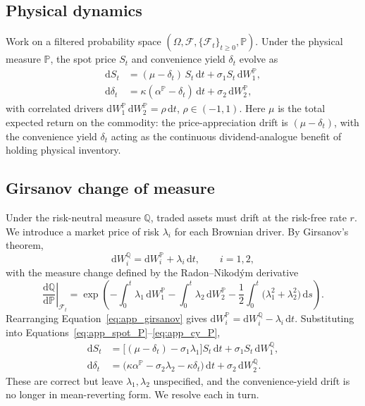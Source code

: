 \documentclass[11pt, a4paper]{article}
\newcommand{\convyield}{\delta}             %
\newcommand{\meanrev}{\kappa}               %
\newcommand{\longrun}{\alpha}               %
\begin{document}
\subsection{Physical dynamics}

Work on a filtered probability space $(\Omega, \mathcal{F}, \{\mathcal{F}_t\}_{t\geq 0}, \mathbb{P})$. Under the physical measure $\mathbb{P}$, the spot price $S_t$ and convenience yield $\convyield_t$ evolve as
\begin{align}
  \label{eq:app_spot_P}
  \mathrm{d}S_t &= (\mu - \convyield_t)\,S_t\,\mathrm{d}t + \sigma_1 S_t\,\mathrm{d}W_1^{\mathbb{P}}, \\
  \label{eq:app_cy_P}
  \mathrm{d}\convyield_t &= \meanrev(\longrun^{\mathbb{P}} - \convyield_t)\,\mathrm{d}t + \sigma_2\,\mathrm{d}W_2^{\mathbb{P}},
\end{align}
\noindent
with correlated drivers $\mathrm{d}W_1^{\mathbb{P}}\,\mathrm{d}W_2^{\mathbb{P}} = \rho\,\mathrm{d}t$, $\rho \in (-1, 1)$. Here $\mu$ is the total expected return on the commodity: the price-appreciation drift is $(\mu - \convyield_t)$, with the convenience yield $\convyield_t$ acting as the continuous dividend-analogue benefit of holding physical inventory.

\subsection{Girsanov change of measure}

Under the risk-neutral measure $\mathbb{Q}$, traded assets must drift at the risk-free rate $r$. We introduce a market price of risk $\lambda_i$ for each Brownian driver. By Girsanov's theorem,
\begin{equation}
  \label{eq:app_girsanov}
  \mathrm{d}W_i^{\mathbb{Q}} = \mathrm{d}W_i^{\mathbb{P}} + \lambda_i\,\mathrm{d}t, \qquad i = 1, 2,
\end{equation}
\noindent
with the measure change defined by the Radon--Nikod\'ym derivative
\begin{equation}
  \label{eq:app_rn}
  \left.\frac{\mathrm{d}\mathbb{Q}}{\mathrm{d}\mathbb{P}}\right|_{\mathcal{F}_t}
  = \exp\!\left(
    -\int_0^t \lambda_1\,\mathrm{d}W_1^{\mathbb{P}}
    -\int_0^t \lambda_2\,\mathrm{d}W_2^{\mathbb{P}}
    -\frac{1}{2}\int_0^t \big(\lambda_1^2 + \lambda_2^2\big)\,\mathrm{d}s
  \right).
\end{equation}
\noindent
Rearranging Equation~\ref{eq:app_girsanov} gives $\mathrm{d}W_i^{\mathbb{P}} = \mathrm{d}W_i^{\mathbb{Q}} - \lambda_i\,\mathrm{d}t$. Substituting into Equations~\ref{eq:app_spot_P}--\ref{eq:app_cy_P},
\begin{align}
  \label{eq:app_spot_sub}
  \mathrm{d}S_t &= \big[(\mu - \convyield_t) - \sigma_1\lambda_1\big] S_t\,\mathrm{d}t + \sigma_1 S_t\,\mathrm{d}W_1^{\mathbb{Q}}, \\
  \label{eq:app_cy_sub}
  \mathrm{d}\convyield_t &= \big(\meanrev\longrun^{\mathbb{P}} - \sigma_2\lambda_2 - \meanrev\convyield_t\big)\,\mathrm{d}t + \sigma_2\,\mathrm{d}W_2^{\mathbb{Q}}.
\end{align}
\noindent
These are correct but leave $\lambda_1, \lambda_2$ unspecified, and the convenience-yield drift is no longer in mean-reverting form. We resolve each in turn.
\end{document}
